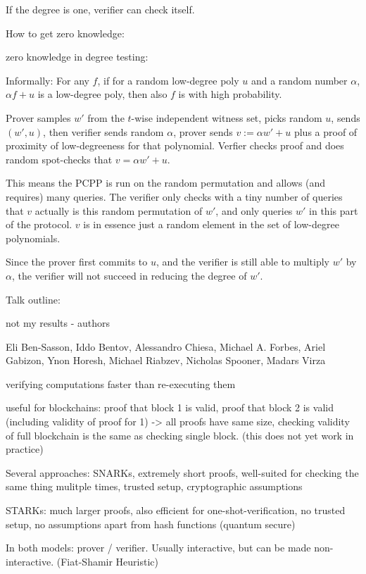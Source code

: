 \documentclass[11pt,letterpaper]{article}
\begin{document}
If the degree is one, verifier can check itself.

How to get zero knowledge:

zero knowledge in degree testing: 

Informally: For any $f$, if for a random low-degree poly $u$ and a random number $\alpha$,
$\alpha f+u$ is a low-degree poly, then also $f$ is with high probability.

Prover samples $w'$ from the $t$-wise independent witness set,
picks random $u$, sends $(w', u)$, then verifier sends random $\alpha$,
prover sends $v := \alpha w' + u$ plus a proof of proximity of low-degreeness for that polynomial.
Verfier checks proof and does random spot-checks that $v  = \alpha w' + u$.

This means the PCPP is run on the random permutation and allows (and requires) many queries.
The verifier only checks with a tiny number
of queries that $v$ actually is this random permutation of $w'$, and only queries
$w'$ in this part of the protocol.
$v$ is in essence just a random element in the set of low-degree polynomials.

Since the prover first commits to $u$, and the verifier is still able to multiply
$w'$ by $\alpha$, the verifier will not succeed in reducing
the degree of $w'$.


Talk outline:

not my results - authors

Eli Ben-Sasson, Iddo Bentov, Alessandro Chiesa, Michael A. Forbes, Ariel Gabizon, Ynon Horesh, Michael Riabzev,
Nicholas Spooner, Madars Virza



verifying computations faster than re-executing them

useful for blockchains: proof that block 1 is valid, proof that block 2 is valid (including validity of proof for 1)
-> all proofs have same size, checking validity of full blockchain is the same as checking single block.
(this does not yet work in practice)

Several approaches: SNARKs, extremely short proofs, well-suited for checking the same thing mulitple times, trusted setup,
cryptographic assumptions

STARKs: much larger proofs, also efficient for one-shot-verification, no trusted setup, no assumptions apart from hash
functions (quantum secure)

In both models: prover / verifier. Usually interactive, but can be made non-interactive. (Fiat-Shamir Heuristic)
\end{document}
